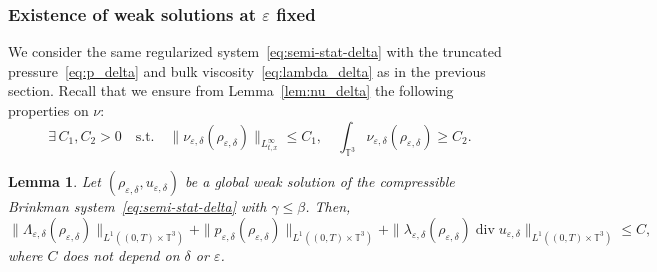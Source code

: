 \documentclass[JEP,XML,SOM,Unicode,NoEqCountersInSection]{cedram}
\newcommand{\<}{\bigl\langle}
\renewcommand{\>}{\bigr\rangle}
\newtheorem{lem}[thm]{Lemma}
\theoremstyle{definition}
\theoremstyle{remark}
\newcommand{\TT}{\mathbb{T}^3}
\DeclareMathOperator{\Div}{div}
\let\ep\varepsilon
\begin{document}

\subsubsection{Existence of weak solutions at $\ep$ fixed}
We consider the same regularized system~\eqref{eq:semi-stat-delta} with the truncated pressure~\eqref{eq:p_delta} and bulk viscosity~\eqref{eq:lambda_delta} as in the previous section.
Recall that we ensure from Lemma~\ref{lem:nu_delta} the following properties on $\nu$:
\begin{equation*}
\exists\, C_1, C_2 > 0 \quad \text{s.t.} \quad \|\nu_{\ep,\delta}(\rho_{\ep,\delta})\|_{L^\infty_{t,x}}\leq C_1,
\quad \int_{\TT}{\nu_{\ep,\delta}(\rho_{\ep,\delta})} \geq C_2.
\end{equation*}
\begin{lem}\label{lem:controls-1} Let $(\rho_{\varepsilon, \delta}, u_{\varepsilon,\delta})$ be a global weak solution of the compressible Brinkman system~\eqref{eq:semi-stat-delta} with $\gamma \leq \beta$. Then,
\[
\|\Lambda_{\varepsilon,\delta}(\rho_{\ep,\delta})\|_{L^1((0,T)\times \TT)}
+\|p_{\varepsilon,\delta}(\rho_{\ep,\delta})\|_{L^1((0,T)\times \TT)}
+\|\lambda_{\varepsilon,\delta}(\rho_{\ep,\delta}) \Div u_{\varepsilon,\delta}\|_{L^1((0,T)\times \TT)}
\leq C,
\]
where $C$ does not depend on $\delta$ or $\ep$.
\end{lem}
\end{document}
